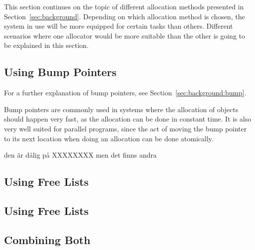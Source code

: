 

This section continues on the topic of different allocation methods presented in Section~\ref{sec:background}. Depending on which allocation method is chosen, the system in use will be more equipped for certain tasks than others. Different scenarios where one allocator would be more suitable than the other is going to be explained in this section.

\subsection{Using Bump Pointers}
For a further explanation of bump pointers, see Section~\ref{sec:background:bump}.

Bump pointers are commonly used in systems where the allocation of objects should happen very fast, as the allocation can be done in constant time. It is also very well suited for parallel programs, since the act of moving the bump pointer to its next location when doing an allocation can be done atomically.



den är dålig på XXXXXXXX men det finns andra

\subsection{Using Free Lists}


\subsection{Using Free Lists}
\subsection{Combining Both}

